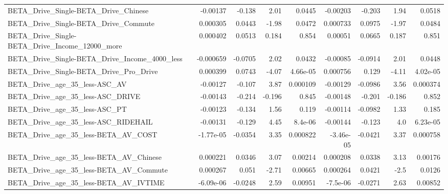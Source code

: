 \begin{tabular}{lrrrrrrrr}
BETA\_Drive\_Single-BETA\_Drive\_Chinese               &    -0.00137 &       -0.138 &      2.01 &   0.0445 &   -0.00203 &      -0.203 &         1.94 &        0.0518 \\
BETA\_Drive\_Single-BETA\_Drive\_Commute               &    0.000305 &       0.0443 &     -1.98 &   0.0472 &   0.000733 &      0.0975 &        -1.97 &        0.0484 \\
BETA\_Drive\_Single-BETA\_Drive\_Income\_12000\_more     &    0.000402 &       0.0513 &     0.184 &    0.854 &    0.00051 &      0.0665 &        0.187 &         0.851 \\
BETA\_Drive\_Single-BETA\_Drive\_Income\_4000\_less      &   -0.000659 &      -0.0705 &      2.02 &   0.0432 &   -0.00085 &     -0.0914 &         2.01 &        0.0448 \\
BETA\_Drive\_Single-BETA\_Drive\_Pro\_Drive             &    0.000399 &       0.0743 &     -4.07 & 4.66e-05 &   0.000756 &       0.129 &        -4.11 &      4.02e-05 \\
BETA\_Drive\_age\_35\_less-ASC\_AV                      &    -0.00127 &       -0.107 &      3.87 & 0.000109 &   -0.00129 &     -0.0986 &         3.56 &      0.000374 \\
BETA\_Drive\_age\_35\_less-ASC\_DRIVE                   &    -0.00143 &       -0.214 &    -0.196 &    0.845 &   -0.00148 &      -0.201 &       -0.186 &         0.852 \\
BETA\_Drive\_age\_35\_less-ASC\_PT                      &    -0.00123 &       -0.134 &      1.56 &    0.119 &   -0.00114 &     -0.0982 &         1.33 &         0.185 \\
BETA\_Drive\_age\_35\_less-ASC\_RIDEHAIL                &    -0.00131 &       -0.129 &      4.45 &  8.4e-06 &   -0.00144 &      -0.123 &          4.0 &      6.23e-05 \\
BETA\_Drive\_age\_35\_less-BETA\_AV\_COST                &   -1.77e-05 &      -0.0354 &      3.35 & 0.000822 &  -3.46e-05 &     -0.0421 &         3.37 &      0.000758 \\
BETA\_Drive\_age\_35\_less-BETA\_AV\_Chinese             &    0.000221 &       0.0346 &      3.07 &  0.00214 &   0.000208 &      0.0338 &         3.13 &       0.00176 \\
BETA\_Drive\_age\_35\_less-BETA\_AV\_Commute             &    0.000267 &        0.051 &     -2.71 &  0.00665 &   0.000264 &      0.0421 &         -2.5 &        0.0126 \\
BETA\_Drive\_age\_35\_less-BETA\_AV\_IVTIME              &   -6.09e-06 &      -0.0248 &      2.59 &  0.00951 &   -7.5e-06 &     -0.0271 &         2.63 &       0.00852 \\

\end{tabular}
